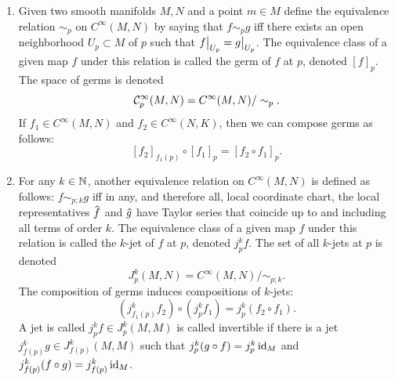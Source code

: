 \begin{defn}\label{def jet bundles}
    \begin{enumerate}
        \item Given two smooth manifolds $M,N$ and a point $m\in M$ define the equivalence relation $\sim_p$ on $C^\infty(M,N)$ by saying that $f\sim_p g$ iff there exists an open neighborhood $U_p\subset M$ of $p$ such that $\restr{f}{U_p}=\restr{g}{U_p}$. The equivalence class of a given map $f$ under this relation is called the germ of $f$ at $p$, denoted $[f]_p$. The space of germs is denoted
        \[\mathcal{C}^\infty_p(M,N)=C^\infty(M,N)\slash \sim_p.\]
        If $f_1\in C^\infty(M,N)$ and $f_2\in C^\infty(N,K)$, then we can compose germs as follows:
        \[[f_2]_{f_1(p)}\circ [f_1]_{p}=[f_2\circ f_1]_p.\]
        \item For any $k\in\mathbb{N}$, another equivalence relation on $C^\infty(M,N)$ is defined as follows: $f\sim_{p;k}g$ iff in any, and therefore all, local coordinate chart, the local representatives $\wh{f}$ and $\wh{g}$ have Taylor series that coincide up to and including all terms of order $k$. The equivalence class of a given map $f$ under this relation is called the $k$-jet of $f$ at $p$, denoted $j_p^k f$. The set of all $k$-jets at $p$ is denoted
        \[J_p^k(M,N)=C^\infty (M,N)\slash \sim_{p;k}.\]
        The composition of germs induces compositions of $k$-jets:
        \[(j_{f_1(p)}^kf_2)\circ (j_p^k f_1)=j_p^k(f_2\circ f_1).\]
        A jet is called $j_p^kf\in J^k_p(M,M)$ is called invertible if there is a jet $j^k_{f(p)}g\in J^k_{f(p)}(M,M)$ such that $j^k_p(g\circ f)=j^k_p\operatorname{id}_M$ and $j^k_{f(p)}(f\circ g)=j^k_{f(p)}\operatorname{id}_M$. 
        

\end{enumerate}
\end{defn}
